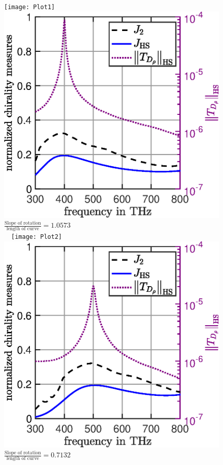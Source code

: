 \documentclass[11pt]{article}
\begin{document}
\begin{figure}
\texttt{[image: Plot1]} \hspace{-.5cm}\includegraphics[scale=.35]{Scan1} $\frac{\text{Slope of rotation}}{\text{length of curve}}= 1.0573$\\ \ \
\texttt{[image: Plot2]} \hspace{-.5cm}\includegraphics[scale=.35]{Scan2} $\frac{\text{Slope of rotation}}{\text{length of curve}}= 0.7132$\\

\end{figure}
\end{document}
